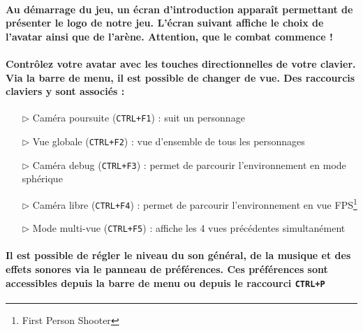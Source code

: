 \vspace{0.5cm}

\paragraph{Au démarrage du jeu, un écran d'introduction appara\^it permettant de présenter le logo de notre jeu. L'écran suivant affiche le choix de l'avatar ainsi que de l'arène. Attention, que le combat commence !}

\paragraph{Contr\^olez votre avatar avec les touches directionnelles de votre clavier. Via la barre de menu, il est possible de changer de vue. Des raccourcis claviers y sont associés :}

\begin{itemize}
	\item[$\triangleright$ Caméra poursuite] (\verb?CTRL+F1?) : suit un personnage
	\item[$\triangleright$ Vue globale] (\verb?CTRL+F2?) : vue d'ensemble de tous les personnages
	\item[$\triangleright$ Caméra debug] (\verb?CTRL+F3?) : permet de parcourir l'environnement en mode sphérique
	\item[$\triangleright$ Caméra libre] (\verb?CTRL+F4?) : permet de parcourir l'environnement en vue FPS\footnote{First Person Shooter}
	\item[$\triangleright$ Mode multi-vue] (\verb?CTRL+F5?) : affiche les 4 vues précédentes simultanément
\end{itemize}

\vspace{0.5cm}

\paragraph{Il est possible de \textbf{régler le niveau du son général}, de la \textbf{musique} et des \textbf{effets sonores} via le panneau de préférences. Ces préférences sont accessibles depuis la barre de menu ou depuis le raccourci \verb?CTRL+P?}
